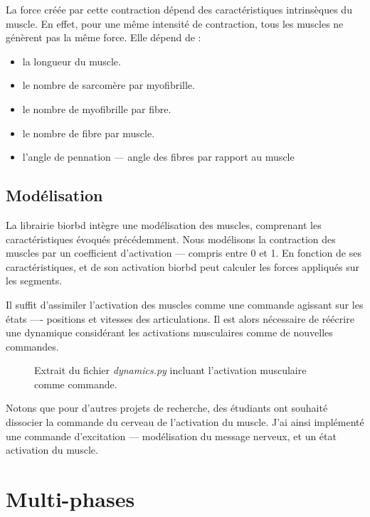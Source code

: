 La force créée par cette contraction dépend des caractéristiques intrinsèques du muscle. En
effet, pour une même intensité de contraction, tous les muscles ne génèrent pas la même force. Elle dépend de :
\begin{itemize}
\setlength\itemsep{-0.5em}
 \item la longueur du muscle.
 \item le nombre de sarcomère par myofibrille.
 \item le nombre de myofibrille par fibre.
 \item le nombre de fibre par muscle.
 \item l'angle de pennation --- angle des fibres par rapport au muscle
\end{itemize}

            \subsection{Modélisation}

La librairie \gls{biorbd} intègre une modélisation des muscles, comprenant les caractéristiques évoqués précédemment. Nous modélisons la contraction des muscles par un coefficient d'activation --- compris entre 0 et 1. En fonction de ses caractéristiques, et de son activation \gls{biorbd} peut calculer les forces appliqués sur les segments.

Il suffit d'assimiler l'activation des muscles comme une commande agissant sur les états ---- positions et vitesses des articulations. Il est alors nécessaire de réécrire une dynamique considérant les activations musculaires comme de nouvelles commandes.

\begin{center}
\setlength\itemsep{-0.5em}

\vspace{-0.6cm}
\begin{figure}[h]
\caption{Extrait du fichier \emph{dynamics.py} incluant l'activation musculaire comme commande.}
\end{figure}
\end{center}


Notons que pour d'autres projets de recherche, des étudiants ont souhaité dissocier la commande du cerveau de l'activation du muscle. J'ai ainsi implémenté une commande d'excitation --- modélisation du message nerveux, et un état activation du muscle.

        \section{Multi-phases}
        
